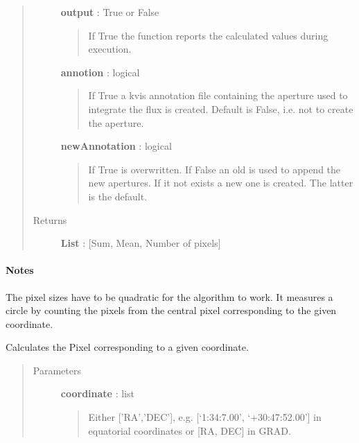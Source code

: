 \documentclass[a4paper,10pt,english]{sphinxmanual}
\begin{document}
\begin{fulllineitems}
\begin{fulllineitems}
\begin{quote}
\begin{description}
\textbf{output} : True or False
\begin{quote}

If True the function reports the calculated values during
execution.
\end{quote}

\textbf{annotion} : logical
\begin{quote}

If True a kvis annotation file  containing the
aperture used to integrate the flux is created. Default is False,
i.e. not to create the aperture.
\end{quote}

\textbf{newAnnotation} : logical
\begin{quote}

If True  is overwritten. If False an old
 is used to append the new apertures. If it not
exists a new one is created. The latter is the default.
\end{quote}

\item[{Returns }] \leavevmode
\textbf{List} :  {[}Sum, Mean, Number of pixels{]}

\end{description}\end{quote}
\paragraph{Notes}

The pixel sizes have to be quadratic for the algorithm to work. It
measures a circle by counting the pixels from the central pixel
corresponding to the given coordinate.

\end{fulllineitems}


\begin{fulllineitems}
\label{maps:astrolyze.maps.fits.FitsMap.sky2pix}
Calculates the Pixel corresponding to a given coordinate.
\begin{quote}\begin{description}
\item[{Parameters }] \leavevmode
\textbf{coordinate} : list
\begin{quote}

Either {[}'RA','DEC'{]}, e.g. {[}`1:34:7.00', `+30:47:52.00'{]} in
equatorial coordinates or {[}RA, DEC{]} in GRAD.
\end{quote}


\end{description}
\end{quote}
\end{fulllineitems}
\end{fulllineitems}
\end{document}
